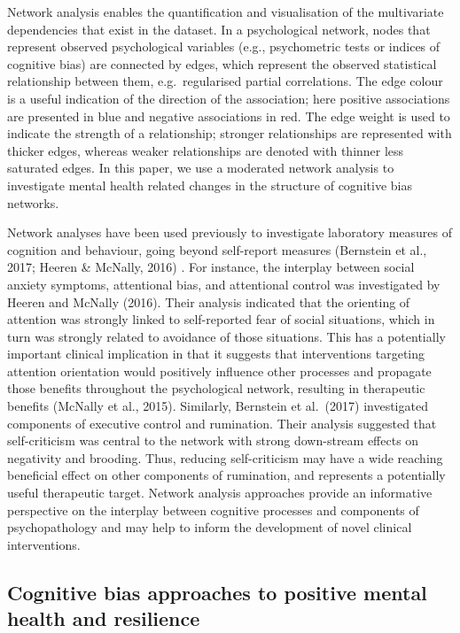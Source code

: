 \documentclass[man,floatsintext]{apa6}
\begin{document}
Network analysis enables the quantification and visualisation of the multivariate dependencies that exist in the dataset. In a psychological network, nodes that represent observed psychological variables (e.g., psychometric tests or indices of cognitive bias) are connected by edges, which represent the observed statistical relationship between them, e.g.~regularised partial correlations. The edge colour is a useful indication of the direction of the association; here positive associations are presented in blue and negative associations in red. The edge weight is used to indicate the strength of a relationship; stronger relationships are represented with thicker edges, whereas weaker relationships are denoted with thinner less saturated edges. In this paper, we use a moderated network analysis to investigate mental health related changes in the structure of cognitive bias networks.

Network analyses have been used previously to investigate laboratory measures of cognition and behaviour, going beyond self-report measures (Bernstein et al., 2017; Heeren \& McNally, 2016) . For instance, the interplay between social anxiety symptoms, attentional bias, and attentional control was investigated by Heeren and McNally (2016). Their analysis indicated that the orienting of attention was strongly linked to self-reported fear of social situations, which in turn was strongly related to avoidance of those situations. This has a potentially important clinical implication in that it suggests that interventions targeting attention orientation would positively influence other processes and propagate those benefits throughout the psychological network, resulting in therapeutic benefits (McNally et al., 2015). Similarly, Bernstein et al.~(2017) investigated components of executive control and rumination. Their analysis suggested that self-criticism was central to the network with strong down-stream effects on negativity and brooding. Thus, reducing self-criticism may have a wide reaching beneficial effect on other components of rumination, and represents a potentially useful therapeutic target. Network analysis approaches provide an informative perspective on the interplay between cognitive processes and components of psychopathology and may help to inform the development of novel clinical interventions.

\hypertarget{cognitive-bias-approaches-to-positive-mental-health-and-resilience}{%
\subsection{Cognitive bias approaches to positive mental health and resilience}\label{cognitive-bias-approaches-to-positive-mental-health-and-resilience}}
\end{document}
